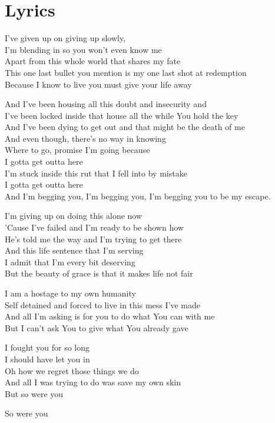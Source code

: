 \documentclass[10pt,a4paper,oneside,twocolumn]{book}
\begin{document}
\section{Lyrics}
\begin{flushleft}
I've given up on giving up slowly,\\
I'm blending in so you won't even know me\\
Apart from this whole world that shares my fate\\
This one last bullet you mention is my one last shot at redemption\\
Because I know to live you must give your life away
\medskip

And I've been housing all this doubt and insecurity and\\
I've been locked inside that house all the while You hold the key\\
And I've been dying to get out and that might be the death of me\\
And even though, there's no way in knowing\\
Where to go, promise I'm going because\\
I gotta get outta here\\
I'm stuck inside this rut that I fell into by mistake\\
I gotta get outta here\\
And I'm begging you, I'm begging you, I'm begging you to be my escape.
\medskip

I'm giving up on doing this alone now\\
'Cause I've failed and I'm ready to be shown how\\
He's told me the way and I'm trying to get there\\
And this life sentence that I'm serving\\
I admit that I'm every bit deserving\\
But the beauty of grace is that it makes life not fair\\
\medskip

I am a hostage to my own humanity\\
Self detained and forced to live in this mess I've made\\
And all I'm asking is for you to do what You can with me\\
But I can't ask You to give what You already gave
\medskip

I fought you for so long\\
I should have let you in\\
Oh how we regret those things we do\\
And all I was trying to do was save my own skin\\
But so were you
\medskip

So were you
\end{flushleft}
\end{document}
